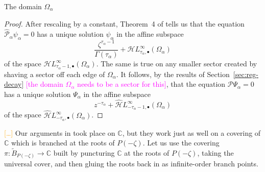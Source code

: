 \documentclass{article}
\newcommand{\singexp}[2]{\mathcal{H}L^\infty_{#1, #2}}
\newcommand{\singexpalg}[1]{\singexp{#1}{\bullet}}
\newcommand{\dualsingexp}[2]{\widehat{\mathcal{H}}L^\infty_{#1, #2}}
\newcommand{\dualsingexpalg}[1]{\dualsingexp{#1}{\bullet}}
\newcommand{\maps}{\colon}
\newcommand{\C}{\mathbb{C}}
\theoremstyle{definition}
\theoremstyle{plain}
\begin{document}
\begin{center}

{\small The domain $\Omega_\alpha$}
\end{center}
\begin{proof}
After rescaling by a constant, Theorem~4 of \cite{reg-sing-volterra} tells us that the equation $\hat{\mathcal{P}}_\alpha \psi_\alpha = 0$ has a unique solution $\psi_\alpha$ in the affine subspace
\[ \frac{\zeta^{\tau_\alpha-1}}{\Gamma(\tau_\alpha)} + \singexpalg{\tau_\alpha}(\Omega_\alpha) \]
of the space $\singexpalg{\tau_\alpha-1}(\Omega_\alpha)$. The same is true on any smaller sector created by shaving a sector off each edge of $\Omega_\alpha$. It follows, by the results of Section~\ref{sec:reg-decay} \textcolor{magenta}{[the domain $\Omega_\alpha$ needs to be a sector for this]}, that the equation $\mathcal{P}\Psi_\alpha = 0$ has a unique solution $\Psi_\alpha$ in the affine subspace
\[ z^{-\tau_\alpha} + \dualsingexpalg{-\tau_\alpha-1}(\Omega_\alpha) \]
of the space $\dualsingexpalg{-\tau_\alpha}(\Omega_\alpha)$.
\end{proof}
\color{RoyalBlue}
\textcolor{orange}{[\ldots]} Our arguments in \cite{reg-sing-volterra} took place on $\C$, but they work just as well on a covering of $\C$ which is branched at the roots of $P(-\zeta)$. Let us use the covering $\pi \maps \widetilde{B}_{P(-\zeta)} \to \C$ built by puncturing $\C$ at the roots of $P(-\zeta)$, taking the universal cover, and then gluing the roots back in as infinite-order branch points.
\end{document}
